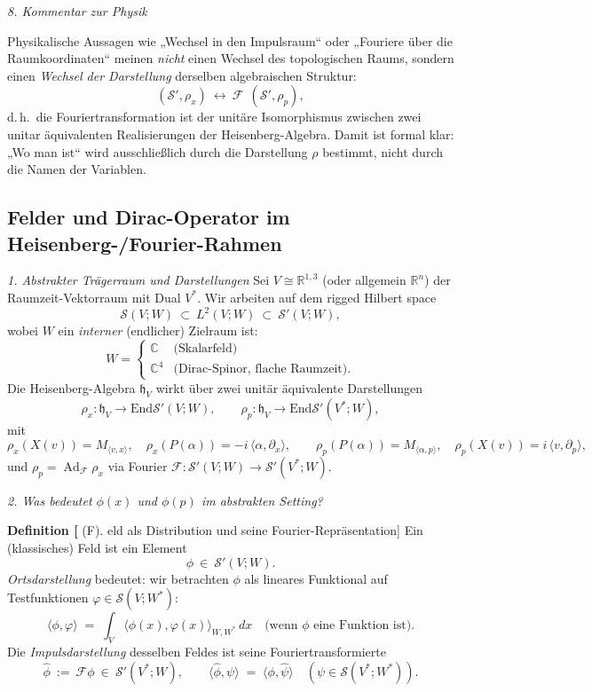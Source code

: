 \documentclass[10pt, letterpaper]{article}
\newcommand{\Ad}{\operatorname{Ad}}
\newcommand{\R}{\mathbb{R}}
\newcommand{\C}{\mathbb{C}}
\newcommand{\End}{\mathrm{End}}
\newcommand{\CustomHeading}[3]{%
  \par\medskip\noindent%
  \textbf{#1 #2} \textnormal{(#3)}.\enskip%
}
\newenvironment{DEF}[2]{\begin{unitbox}\CustomHeading{Definition}{#1}{#2}}{\end{unitbox}}
\begin{document}
\emph{8. Kommentar zur Physik}

Physikalische Aussagen wie „Wechsel in den Impulsraum“ oder „Fouriere über die Raumkoordinaten“
meinen \emph{nicht} einen Wechsel des topologischen Raums, sondern einen
\emph{Wechsel der Darstellung} derselben algebraischen Struktur:
\[
(\mathcal{S}', \rho_x)
\ \leftrightarrow{\ \mathcal{F}\ }\ 
(\mathcal{S}', \rho_p),
\]
d.\,h.\ die Fouriertransformation ist der unitäre Isomorphismus zwischen
zwei unitar äquivalenten Realisierungen der Heisenberg-Algebra.
Damit ist formal klar:
„Wo man ist“ wird ausschließlich durch die Darstellung $\rho$ bestimmt, nicht durch die Namen der Variablen.



\subsection{Felder und Dirac-Operator im Heisenberg-/Fourier-Rahmen}

\emph{1. Abstrakter Trägerraum und Darstellungen}
Sei $V\cong\R^{1,3}$ (oder allgemein $\R^n$) der Raumzeit-Vektorraum mit Dual $V^\ast$.
Wir arbeiten auf dem rigged Hilbert space
\[
\mathcal{S}(V;W)\ \subset\ L^2(V;W)\ \subset\ \mathcal{S}'(V;W),
\]
wobei $W$ ein \emph{interner} (endlicher) Zielraum ist:
\[
W=
\begin{cases}
\C & \text{(Skalarfeld)}\\
\C^4 & \text{(Dirac-Spinor, flache Raumzeit)}.
\end{cases}
\]
Die Heisenberg-Algebra $\mathfrak{h}_V$ wirkt über zwei unitär äquivalente Darstellungen
\[
\rho_x:\mathfrak{h}_V\to\End\mathcal{S}'(V;W),\qquad
\rho_p:\mathfrak{h}_V\to\End\mathcal{S}'(V^\ast;W),
\]
mit
\[
\rho_x(X(v))=M_{\langle v,x\rangle},\quad
\rho_x(P(\alpha))=-i\,\langle \alpha,\partial_x\rangle,
\qquad
\rho_p(P(\alpha))=M_{\langle \alpha,p\rangle},\quad
\rho_p(X(v))=i\,\langle v,\partial_p\rangle,
\]
und $\rho_p=\Ad_{\mathcal{F}}\rho_x$ via Fourier $\mathcal{F}:\mathcal{S}'(V;W)\to\mathcal{S}'(V^\ast;W)$.

\emph{2. Was bedeutet $\phi(x)$ und $\phi(p)$ im abstrakten Setting?}

\begin{DEF}[Feld als Distribution und seine Fourier-Repräsentation]
Ein (klassisches) Feld ist ein Element
\[
\phi\ \in\ \mathcal{S}'(V;W).
\]
\emph{Ortsdarstellung} bedeutet: wir betrachten $\phi$ als lineares Funktional auf Testfunktionen
$\varphi\in\mathcal{S}(V;W^\ast)$:
\[
\langle \phi,\varphi\rangle\;=\;\int_V \langle \phi(x),\varphi(x)\rangle_{W,W^\ast}\,dx
\quad\text{(wenn $\phi$ eine Funktion ist)}.
\]
Die \emph{Impulsdarstellung} desselben Feldes ist seine Fouriertransformierte
\[
\hat\phi\ :=\ \mathcal{F}\phi\ \in\ \mathcal{S}'(V^\ast;W),
\qquad
\langle \hat\phi,\psi\rangle\;=\;\langle \phi,\hat\psi\rangle
\quad(\psi\in\mathcal{S}(V^\ast;W^\ast)).
\]
\end{DEF}
\end{document}
